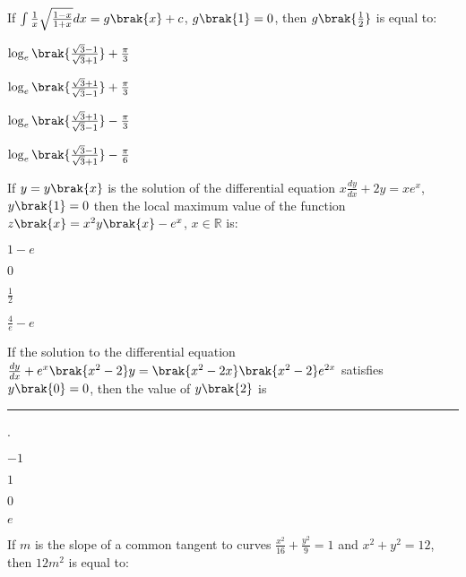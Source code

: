 \item If $\int\frac{1}{x}\sqrt{\frac{1-x}{1+x}}dx=g\brak{x}+c$, $g\brak{1}=0$, then $g\brak{\frac{1}{2}}$ is equal to:

\hfill{}
\begin{enumerate}
\begin{multicols}{4}
\item $\log_e{\brak{\frac{\sqrt{3}-1}{\sqrt{3}+1}}}+\frac{\pi}{3}$
\item $\log_e{\brak{\frac{\sqrt{3}+1}{\sqrt{3}-1}}}+\frac{\pi}{3}$
\item $\log_e{\brak{\frac{\sqrt{3}+1}{\sqrt{3}-1}}}-\frac{\pi}{3}$
\item $\log_e{\brak{\frac{\sqrt{3}-1}{\sqrt{3}+1}}}-\frac{\pi}{6}$
\end{multicols}
\end{enumerate}

\item If $y=y\brak{x}$ is the solution of the differential equation $x\frac{dy}{dx}+2y=xe^x$, $y\brak{1}=0$ then the local maximum value of the function $z\brak{x}=x^2 y\brak{x} - e^x$, $x \in \mathbb{R}$ is:

\hfill{}
\begin{enumerate}
\begin{multicols}{4}
\item $1-e$
\item $0$
\item $\frac{1}{2}$
\item $\frac{4}{e}-e$
\end{multicols}
\end{enumerate}

\item If the solution to the differential equation $\frac{dy}{dx}+e^{x}\brak{x^2-2}y=\brak{x^2-2x}\brak{x^2-2}e^{2x}$ satisfies $y\brak{0}=0$, then the value of $y\brak{2}$ is \rule{1cm}{0.15mm}.

\hfill{}
\begin{enumerate}
\begin{multicols}{4}
\item $-1$
\item $1$
\item $0$
\item $e$
\end{multicols}
\end{enumerate}

\item If $m$ is the slope of a common tangent to curves $\frac{x^2}{16}+\frac{y^2}{9}=1$ and $x^2+y^2=12$, then $12m^2$ is equal to:

